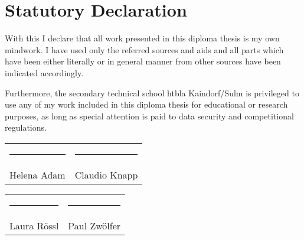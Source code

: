\chapter*{Statutory Declaration}
With this I declare that all work presented in this diploma thesis is my own mindwork. I have used only the referred sources and aids and all parts which have been either literally or in general manner from other sources have been indicated accordingly.

Furthermore, the secondary technical school \gls{htbla} Kaindorf/Sulm is privileged to use any of my work included in this diploma thesis for educational or research purposes, as long as special attention is paid to data security and competitional regulations.
\par\bigskip

\par\bigskip

\par\bigskip

\par\bigskip

\par\bigskip

\par\bigskip

\par\bigskip

\par\bigskip

\par\bigskip

\par\bigskip

\par\bigskip

\par\bigskip

\begin{tabular}{p{7cm}p{7cm}}
\rule{6cm}{0.4pt} & \rule{6cm}{0.4pt}\\
Helena Adam & Claudio Knapp
\end{tabular}

\par\bigskip

\par\bigskip

\par\bigskip

\par\bigskip

\par\bigskip

\par\bigskip

\begin{tabular}{p{7cm}p{7cm}}
\rule{6cm}{0.4pt} & \rule{6cm}{0.4pt}\\
Laura Rössl & Paul Zwölfer
\end{tabular}


